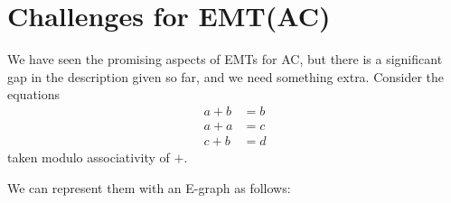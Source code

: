\documentclass[12pt,a4paper,twoside,openright]{report}
\numberwithin{equation}{chapter}		%
\numberwithin{figure}{chapter}			%
\numberwithin{table}{chapter}			%
\theoremstyle{definition}
\theoremstyle{plain}
\begin{document}
\begin{center}
	\begin{tikzpicture}[
			scale=2,
			transform shape,
			every node/.style={
					draw,
					fill=white,
					text height=1.5ex, %
					text depth=0.25ex, %
					rounded corners
				}
		]
		
	\end{tikzpicture}
  \label{emte3}
\end{center}

\section{Challenges for EMT(AC)} \label{challenge}
We have seen the promising aspects of EMTs for AC, but there is a significant gap in the description given so far, and we need something extra. Consider the equations
\begin{align}
	a + b &= b \\
	a + a &= c \\
	c + b &= d
\end{align}
taken modulo associativity of $+$.

We can represent them with an E-graph as follows:
\end{document}
